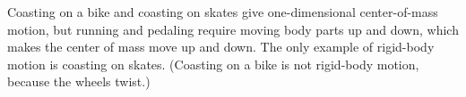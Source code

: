 Coasting on a bike and coasting on skates give one-dimensional
 center-of-mass motion, but running and pedaling
require moving body parts up and down, which makes
 the center of mass move up and down. The only example of
rigid-body motion is coasting on skates. (Coasting on
 a bike is not rigid-body motion, because the wheels twist.)



